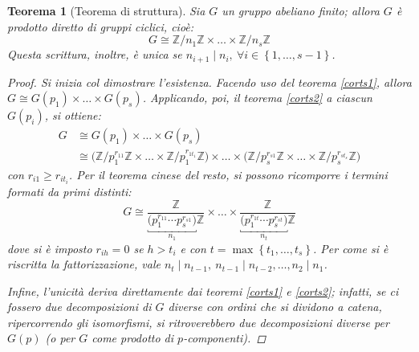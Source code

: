 \documentclass[12pt]{scrartcl}
\theoremstyle{style}
\newtheorem{teorema}{Teorema}[section]
\numberwithin{equation}{subsection}
\begin{document}
\begin{teorema}
	[Teorema di struttura]
	Sia $G$ un gruppo abeliano finito; allora $G$ \`e prodotto diretto di gruppi ciclici, cio\`e:
	\[
	G \cong \mathbb{Z}/n_1\mathbb{Z} \times  \ldots \times \mathbb{Z} / n_s \mathbb{Z}
	\] 
	Questa scrittura, inoltre, \`e unica se $n_{i+1}  \mid n_i, \ \forall i \in \left\{ 1, \ldots, s-1 \right\} $.
	\begin{proof}
		Si inizia col dimostrare l'esistenza. 
		Facendo uso del teorema \ref{corts1}, allora $G \cong G(p_1) \times \ldots \times G(p_s)$. 
		Applicando, poi, il teorema \ref{corts2} a ciascun $G(p_i)$, si ottiene:
		\[
			\begin{split}
				G &\cong G(p_1) \times  \ldots \times G(p_s) \\
				  &\cong \Big(\mathbb{Z}/p_1^{r_{11} }\mathbb{Z} \times \ldots \times \mathbb{Z}/ p_1^{r_{1t_1} }\mathbb{Z}\Big) \times  \ldots \times \Big(\mathbb{Z}/ p_s^{r_{s1} }\mathbb{Z}\times  \ldots\times \mathbb{Z}/p_s^{r_{st_s} }\mathbb{Z}  \Big) 
			\end{split}
		\] 
		con $r_{i 1} \ge r_{i t_i} $. 
		Per il teorema cinese del resto, si possono ricomporre i termini formati da primi distinti:
		\[
			G\cong \frac{\mathbb{Z}}{\underbracket{\big(p_1^{r_{11}} \cdots p_s^{r_{s 1} } \big)}_{n_1} \mathbb{Z}} \times  \ldots \times \frac{\mathbb{Z}}{ \underbracket{\big(p_1^{r_{1t} }\cdots p_s^{r_{st} } \big)}_{n_t} \mathbb{Z}}
		\] 
	dove si \`e imposto $r_{ih} =0$ se $h>t_i$ e con $t = \max \left\{ t_1,\ldots,t_s \right\} $.
	Per come si \`e riscritta la fattorizzazione, vale $n_t  \mid  n_{t-1} , \ n_{t-1}  \mid n_{t-2} , \ldots, n_2 \mid n_1$.

	Infine, l'unicit\`a deriva direttamente dai teoremi \ref{corts1} e \ref{corts2}; infatti, se ci fossero due decomposizioni di $G$ diverse con ordini che si dividono a catena, ripercorrendo gli isomorfismi, si ritroverebbero due decomposizioni diverse per $G(p)$ (o per $G$ come prodotto di $p$-componenti).
	\end{proof}
\end{teorema}
\end{document}
